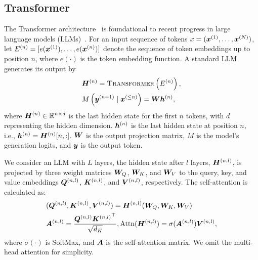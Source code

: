 \subsection{Transformer} 
The Transformer architecture~\citep{vaswani2017attention} is foundational to recent progress in large language models (LLMs)~\citep{liu2024deepseek, zeng2024skywork,yang2024qwen2,team2023gemini}. For an input sequence of tokens $x = (\idx[\vx][][1], \dots, \idx[\vx][][N])$, let \( \idx[E][][n][] = [e(\idx[\vx][][1]), \dots, e(\idx[\vx][][n])] \) denote the sequence of token embeddings up to position $n$, where $e(\cdot)$ is the token embedding function. A standard LLM generates its output by
\begin{align}
&\idx[\mH][][n]=\textsc{Transformer}\left(\idx[E][][n]\right),\nonumber \\
&M\left(\idx[\vy][][n+1] \mid \idx[\vx][][\leq n]\right)=\mW \idx[\vh][][n],\label{equ:token_logits}
\end{align}
where $\idx[\mH][][n] \in \mathbb{R}^{n \times d}$ is the last hidden state for the first $n$ tokens, with $d$ representing the hidden dimension. $\idx[\vh][][n]$ is the last hidden state at position $n$, i.e., $\idx[\vh][][n] = \idx[\mH][][n][] [n, :]$. ${\bm{W}}$ is the output projection matrix, $M$ is the model's generation logits, and ${\bm{y}}$ is the output token.

We consider an LLM with $L$ layers, the hidden state after $l$ layers, $\idx[\mH][][n,l]$, is projected by three weight matrices \({\bm{W}}_Q \), \({\bm{W}}_K \), and \({\bm{W}}_V \) to the query, key, and value embeddings $\idx[\mQ][][n,l]$, $\idx[\mK][][n,l]$, and $\idx[\mV][][n,l]$, respectively. The self-attention is calculated as:
\begin{align}
&(\idx[\mQ][][n,l], \idx[\mK][][n,l], \idx[\mV][][n,l]) = \idx[\mH][][n,l] (\mW_Q, \mW_K, \mW_V) \nonumber\\
&\idx[\mA][][n,l] = \frac{\idx[\mQ][][n,l] {\idx[\mK][][n,l]}^\top}{\sqrt{d_K}}, \text{Attn}(\idx[\mH][][n,l]) = \sigma(\idx[\mA][][n,l]) \idx[\mV][][n,l],    \nonumber
\end{align}
where $\sigma(\cdot)$ is SoftMax, and ${\bm{A}}$ is the self-attention matrix. We omit the multi-head attention for simplicity.


